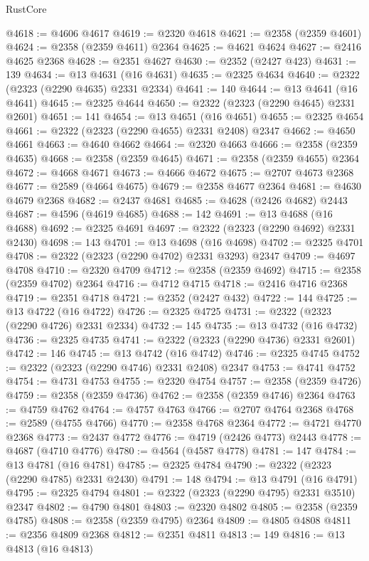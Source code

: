 \begin{lexlean}{RustCore}
\begin{coremodule}
@4618 := @4606 @4617
@4619 := @2320 @4618
@4621 := @2358 (@2359 @4601)
@4624 := @2358 (@2359 @4611) @2364
@4625 := @4621 @4624
@4627 := @2416 @4625 @2368
@4628 := @2351 @4627
@4630 := @2352 (@2427 @423)
@4631 := 139
@4634 := @13 @4631 (@16 @4631)
@4635 := @2325 @4634
@4640 := @2322 (@2323 (@2290 @4635) @2331 @2334)
@4641 := 140
@4644 := @13 @4641 (@16 @4641)
@4645 := @2325 @4644
@4650 := @2322 (@2323 (@2290 @4645) @2331 @2601)
@4651 := 141
@4654 := @13 @4651 (@16 @4651)
@4655 := @2325 @4654
@4661 := @2322 (@2323 (@2290 @4655) @2331 @2408) @2347
@4662 := @4650 @4661
@4663 := @4640 @4662
@4664 := @2320 @4663
@4666 := @2358 (@2359 @4635)
@4668 := @2358 (@2359 @4645)
@4671 := @2358 (@2359 @4655) @2364
@4672 := @4668 @4671
@4673 := @4666 @4672
@4675 := @2707 @4673 @2368
@4677 := @2589 (@4664 @4675)
@4679 := @2358 @4677 @2364
@4681 := @4630 @4679 @2368
@4682 := @2437 @4681
@4685 := @4628 (@2426 @4682) @2443
@4687 := @4596 (@4619 @4685)
@4688 := 142
@4691 := @13 @4688 (@16 @4688)
@4692 := @2325 @4691
@4697 := @2322 (@2323 (@2290 @4692) @2331 @2430)
@4698 := 143
@4701 := @13 @4698 (@16 @4698)
@4702 := @2325 @4701
@4708 := @2322 (@2323 (@2290 @4702) @2331 @3293) @2347
@4709 := @4697 @4708
@4710 := @2320 @4709
@4712 := @2358 (@2359 @4692)
@4715 := @2358 (@2359 @4702) @2364
@4716 := @4712 @4715
@4718 := @2416 @4716 @2368
@4719 := @2351 @4718
@4721 := @2352 (@2427 @432)
@4722 := 144
@4725 := @13 @4722 (@16 @4722)
@4726 := @2325 @4725
@4731 := @2322 (@2323 (@2290 @4726) @2331 @2334)
@4732 := 145
@4735 := @13 @4732 (@16 @4732)
@4736 := @2325 @4735
@4741 := @2322 (@2323 (@2290 @4736) @2331 @2601)
@4742 := 146
@4745 := @13 @4742 (@16 @4742)
@4746 := @2325 @4745
@4752 := @2322 (@2323 (@2290 @4746) @2331 @2408) @2347
@4753 := @4741 @4752
@4754 := @4731 @4753
@4755 := @2320 @4754
@4757 := @2358 (@2359 @4726)
@4759 := @2358 (@2359 @4736)
@4762 := @2358 (@2359 @4746) @2364
@4763 := @4759 @4762
@4764 := @4757 @4763
@4766 := @2707 @4764 @2368
@4768 := @2589 (@4755 @4766)
@4770 := @2358 @4768 @2364
@4772 := @4721 @4770 @2368
@4773 := @2437 @4772
@4776 := @4719 (@2426 @4773) @2443
@4778 := @4687 (@4710 @4776)
@4780 := @4564 (@4587 @4778)
@4781 := 147
@4784 := @13 @4781 (@16 @4781)
@4785 := @2325 @4784
@4790 := @2322 (@2323 (@2290 @4785) @2331 @2430)
@4791 := 148
@4794 := @13 @4791 (@16 @4791)
@4795 := @2325 @4794
@4801 := @2322 (@2323 (@2290 @4795) @2331 @3510) @2347
@4802 := @4790 @4801
@4803 := @2320 @4802
@4805 := @2358 (@2359 @4785)
@4808 := @2358 (@2359 @4795) @2364
@4809 := @4805 @4808
@4811 := @2356 @4809 @2368
@4812 := @2351 @4811
@4813 := 149
@4816 := @13 @4813 (@16 @4813)

\end{coremodule}
\end{lexlean}
